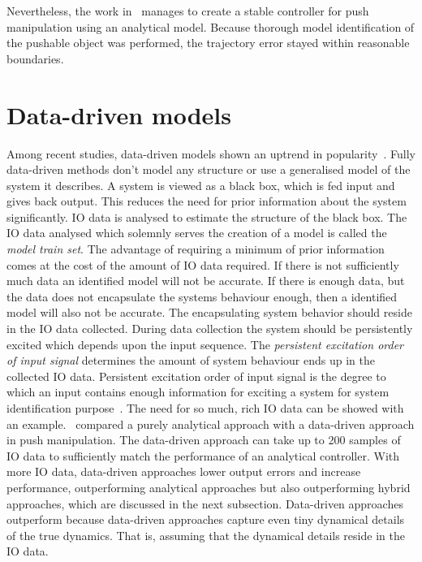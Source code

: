 Nevertheless, the work in~\cite{bauza_dataefficient_2018} manages to create a stable controller for push manipulation using an analytical model. Because thorough model identification of the pushable object was performed, the trajectory error stayed within reasonable boundaries.\bs

\section*{Data-driven models}
Among recent studies, data-driven models shown an uptrend in popularity~\cite{mericli_pushmanipulation_2015,bauza_dataefficient_2018,stuber_featurebased_2018,stuber_let_2020}. Fully data-driven methods don't model any structure or use a generalised model of the system it describes. A system is viewed as a black box, which is fed input and gives back output. This reduces the need for prior information about the system significantly. \ac{IO} data is analysed to estimate the structure of the black box. The \ac{IO} data analysed which solemnly serves the creation of a model is called the \textit{model train set}. The advantage of requiring a minimum of prior information comes at the cost of the amount of \ac{IO} data required. If there is not sufficiently much data an identified model will not be accurate. If there is enough data, but the data does not encapsulate the systems behaviour enough, then a identified model will also not be accurate. The encapsulating system behavior should reside in the \ac{IO} data collected. During data collection the system should be persistently excited which depends upon the input sequence. The \textit{persistent excitation order of input signal} determines the amount of system behaviour ends up in the collected \ac{IO} data. Persistent excitation order of input signal is the degree to which an input contains enough information for exciting a system for system identification purpose~\cite{songsirijitkomut_input_2022}. The need for so much, rich \ac{IO} data can be showed with an example.~\cite{bauza_dataefficient_2018} compared a purely analytical approach with a data-driven approach in push manipulation. The data-driven approach can take up to 200 samples of \ac{IO} data to sufficiently match the performance of an analytical controller. With more \ac{IO} data, data-driven approaches lower output errors and increase performance, outperforming analytical approaches but also outperforming hybrid approaches, which are discussed in the next subsection. Data-driven approaches outperform because data-driven approaches capture even tiny dynamical details of the true dynamics. That is, assuming that the dynamical details reside in the \ac{IO} data.\\

